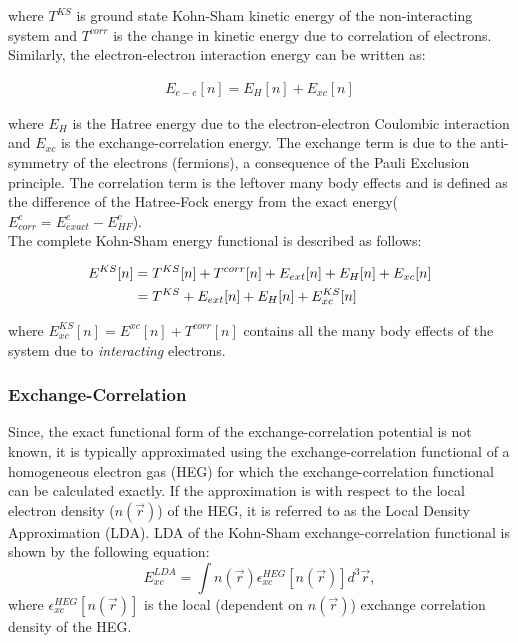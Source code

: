\noindent where $T^{KS}$ is ground state Kohn-Sham kinetic energy of the non-interacting system and  $T^{corr}$ is the change in kinetic energy due to correlation of electrons. Similarly, the electron-electron interaction energy can be written as:

\begin{align}
   E_{e-e} [n] = E_{H} [n] + E_{xc} [n] \label{DFT-5}
\end{align}

\noindent where $E_{H}$ is the Hatree energy due to the electron-electron Coulombic interaction and $E_{xc}$ is the exchange-correlation energy. The exchange term is due to the anti-symmetry of the electrons (fermions), a consequence of the Pauli Exclusion principle. The correlation term is the leftover many body effects and is defined as the difference of the Hatree-Fock energy from the exact energy($E^{e}_{corr}=E^{e}_{exact}-E^{e}_{HF}$). \\

\noindent The complete Kohn-Sham energy functional is described as follows:

\begin{align}
    E^{KS}[n]&=T^{KS}[n]+T^{corr}[n]+E_{ext}[n]+E_{H}[n]+E_{xc}[n]\notag \\
             &=T^{KS}+E_{ext}[n]+E_{H}[n]+E^{KS}_{xc}[n] \label{DFT-6}
\end{align}

\noindent where $E^{KS}_{xc}[n]=E^{xc}[n] + T^{corr}[n]$ contains all the many body effects of the system due to \textit{interacting} electrons. 

\subsubsection*{Exchange-Correlation}
\noindent Since, the exact functional form of the exchange-correlation potential is not known, it is typically approximated using the exchange-correlation functional of a homogeneous electron gas (HEG) for which the exchange-correlation functional can be calculated exactly. If the approximation is with respect to the local electron density ($n(\vec{r})$) of the HEG, it is referred to as the Local Density Approximation (LDA). LDA of the Kohn-Sham exchange-correlation functional is shown by the following equation:   
\begin{equation}
\label{DFT-7}
E_{xc}^{LDA} = \int n(\vec{r}) \epsilon_{xc}^{HEG}[n(\vec{r})] d^{3}\vec{r},
\end{equation}
\noindent where $\epsilon_{xc}^{HEG}[n(\vec{r})]$ is the local (dependent on $n(\vec{r})$) exchange correlation density of the HEG. 

